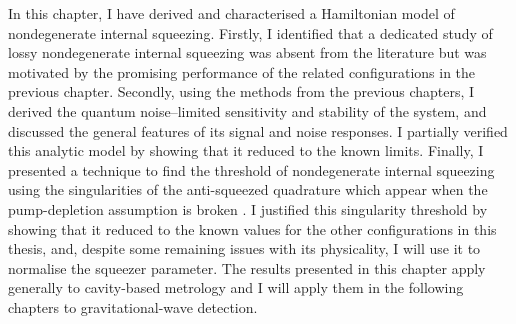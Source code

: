 In this chapter, I have derived and characterised a Hamiltonian model of nondegenerate internal squeezing. Firstly, I identified that a dedicated study of lossy nondegenerate internal squeezing was absent from the literature but was motivated by the promising performance of the related configurations in the previous chapter. Secondly, using the methods from the previous chapters, I derived the quantum noise--limited sensitivity and stability of the system, and discussed the general features of its signal and noise responses. I partially verified this analytic model by showing that it reduced to the known limits. Finally, I presented a  technique to find the threshold of nondegenerate internal squeezing using the singularities of the anti-squeezed quadrature which appear when the pump-depletion assumption is broken . I justified this singularity threshold by showing that it reduced to the known values for the other configurations in this thesis, and, despite some remaining issues with its physicality, I will use it to normalise the squeezer parameter. 
The results presented in this chapter apply generally to cavity-based metrology and I will apply them in the following chapters to gravitational-wave detection.



